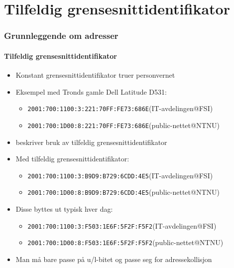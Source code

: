 \section{Tilfeldig grensesnittidentifikator}
\begin{frame}
  \frametitle{Grunnleggende om adresser}
  \framesubtitle{Tilfeldig grensesnittidentifikator}
  \begin{itemize}
  \item Konstant grensesnittidentifikator truer personvernet
  \item Eksempel med Tronds gamle Dell Latitude D531:
    \begin{itemize}
    \item \texttt{2001:700:1100:3:\alert{221:70FF:FE73:686E}}\hfill(IT-avdelingen@FSI)
    \item \texttt{2001:700:1D00:8:\alert{221:70FF:FE73:686E}}\hfill(public-nettet@NTNU)
    \end{itemize}
  \item {} beskriver bruk av tilfeldig grensesnittidentifikator
  \item Med tilfeldig grensesnittidentifikator:
    \begin{itemize}
    \item \texttt{2001:700:1100:3:\alert{B9D9:B729:6CDD:4E5}}\hfill(IT-avdelingen@FSI)
    \item \texttt{2001:700:1D00:8:\alert{B9D9:B729:6CDD:4E5}}\hfill(public-nettet@NTNU)
    \end{itemize}
  \item Disse byttes ut typisk hver dag:
    \begin{itemize}
    \item \texttt{2001:700:1100:3:\alert{F503:1E6F:5F2F:F5F2}}\hfill(IT-avdelingen@FSI)
    \item \texttt{2001:700:1D00:8:\alert{F503:1E6F:5F2F:F5F2}}\hfill(public-nettet@NTNU)
    \end{itemize}
  \item Man må bare passe på u/l-bitet og passe seg for adressekollisjon
  \end{itemize}
\end{frame}

